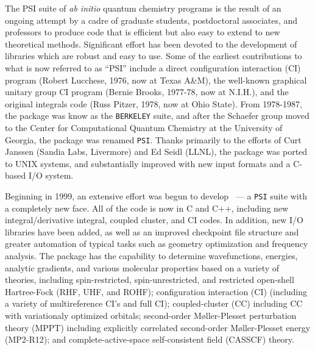 %
%
%

The PSI suite of {\em ab initio} quantum chemistry programs is the result
of an ongoing attempt by a cadre of graduate students, postdoctoral
associates, and professors to produce code that is efficient but also
easy to extend to new theoretical methods.  Significant effort has been
devoted to the development of libraries which are robust and easy to use.
Some of the earliest contributions to what is now referred to as ``PSI''
include a direct configuration interaction (CI) program (Robert Lucchese,
1976, now at Texas A\&M), the well-known graphical unitary group CI program
(Bernie Brooks, 1977-78, now at N.I.H.), and the original integrals code
(Russ Pitzer, 1978, now at Ohio State).  From 1978-1987, the package was
know as the {\tt BERKELEY} suite, and after the Schaefer group moved to the
Center for Computational Quantum Chemistry at the University of Georgia,
the package was renamed {\tt PSI}.  Thanks primarily to the efforts of Curt
Janssen (Sandia Labs, Livermore) and Ed Seidl (LLNL), the package was
ported to UNIX systems, and substantially improved with new input formats
and a C-based I/O system.

Beginning in 1999, an extensive effort was begun to develop \PSIthree\ ---
a {\tt PSI} suite with a completely new face.  All of the code is now in
C and C++, including new integral/derivative integral, coupled cluster,
and CI codes.  In addition, new I/O libraries have been added, as well as
an improved checkpoint file structure and greater automation of typical
tasks such as geometry optimization and frequency analysis.  The package
has the capability to determine wavefunctions, energies, analytic gradients,
and various molecular properties based on a variety of theories, including
spin-restricted, spin-unrestricted, and restricted open-shell Hartree-Fock
(RHF, UHF, and ROHF); configuration interaction (CI) (including a variety
of multireference CI's and full CI); coupled-cluster (CC) including CC with
variationaly optimized orbitals; second-order M{\o}ller-Plesset perturbation
theory (MPPT) including explicitly correlated second-order M{\o}ller-Plesset
energy (MP2-R12); and complete-active-space self-consistent field (CASSCF)
theory.

